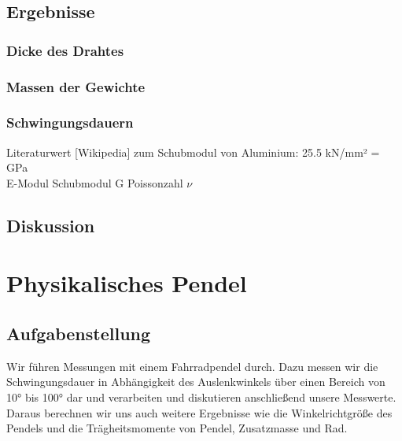 \documentclass{article}
\begin{document}
\subsection{Ergebnisse}
\subsubsection*{Dicke des Drahtes}
\subsubsection*{Massen der Gewichte}
\subsubsection*{Schwingungsdauern}
Literaturwert [Wikipedia] zum Schubmodul von Aluminium: 25.5 kN/mm² = GPa\\
E-Modul
Schubmodul G
Poissonzahl $\nu$
\subsection{Diskussion}
\section{Physikalisches Pendel}
\subsection{Aufgabenstellung}
Wir führen Messungen mit einem Fahrradpendel durch. Dazu messen wir die Schwingungsdauer in Abhängigkeit des Auslenkwinkels über einen Bereich von 10° bis 100° dar und verarbeiten und diskutieren anschließend unsere Messwerte. 
Daraus berechnen wir uns auch weitere Ergebnisse wie die Winkelrichtgröße des Pendels und die Trägheitsmomente von Pendel, Zusatzmasse und Rad. 
\end{document}
